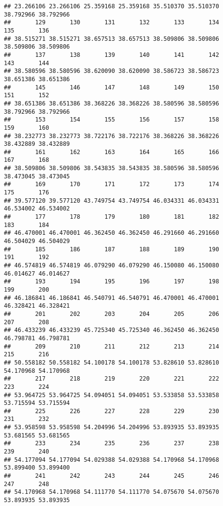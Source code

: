 \documentclass[
]{article}
\begin{document}
\begin{verbatim}
## 23.266106 23.266106 25.359168 25.359168 35.510370 35.510370 38.792966 38.792966 
##       129       130       131       132       133       134       135       136 
## 38.515271 38.515271 38.657513 38.657513 38.509806 38.509806 38.509806 38.509806 
##       137       138       139       140       141       142       143       144 
## 38.580596 38.580596 38.620090 38.620090 38.586723 38.586723 38.651386 38.651386 
##       145       146       147       148       149       150       151       152 
## 38.651386 38.651386 38.368226 38.368226 38.580596 38.580596 38.792966 38.792966 
##       153       154       155       156       157       158       159       160 
## 38.232773 38.232773 38.722176 38.722176 38.368226 38.368226 38.432889 38.432889 
##       161       162       163       164       165       166       167       168 
## 38.509806 38.509806 38.543835 38.543835 38.580596 38.580596 38.473045 38.473045 
##       169       170       171       172       173       174       175       176 
## 39.577120 39.577120 43.749754 43.749754 46.034331 46.034331 46.534002 46.534002 
##       177       178       179       180       181       182       183       184 
## 46.470001 46.470001 46.362450 46.362450 46.291660 46.291660 46.504029 46.504029 
##       185       186       187       188       189       190       191       192 
## 46.574819 46.574819 46.079290 46.079290 46.150080 46.150080 46.014627 46.014627 
##       193       194       195       196       197       198       199       200 
## 46.186841 46.186841 46.540791 46.540791 46.470001 46.470001 46.328421 46.328421 
##       201       202       203       204       205       206       207       208 
## 46.433239 46.433239 45.725340 45.725340 46.362450 46.362450 46.798781 46.798781 
##       209       210       211       212       213       214       215       216 
## 50.558182 50.558182 54.100178 54.100178 53.828610 53.828610 54.170968 54.170968 
##       217       218       219       220       221       222       223       224 
## 53.964725 53.964725 54.094051 54.094051 53.533858 53.533858 53.715594 53.715594 
##       225       226       227       228       229       230       231       232 
## 53.958598 53.958598 54.204996 54.204996 53.893935 53.893935 53.681565 53.681565 
##       233       234       235       236       237       238       239       240 
## 54.177094 54.177094 54.029388 54.029388 54.170968 54.170968 53.899400 53.899400 
##       241       242       243       244       245       246       247       248 
## 54.170968 54.170968 54.111770 54.111770 54.075670 54.075670 53.893935 53.893935 

\end{verbatim}
\end{document}

